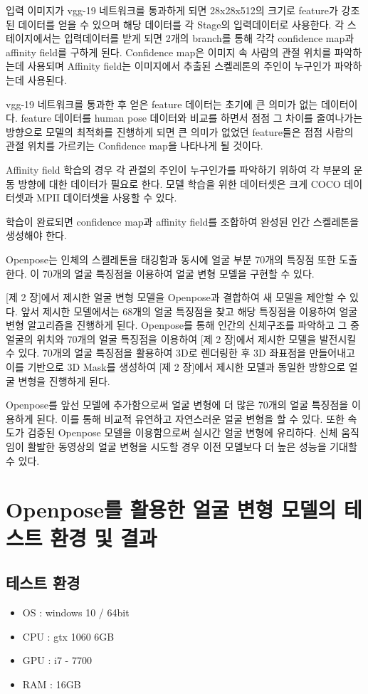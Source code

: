 \documentclass{oblivoir}
\newcommand{\spec}{
    \begin{itemize}
        \item OS : windows 10 / 64bit
        \item CPU : gtx 1060 6GB
        \item GPU : i7 - 7700
        \item RAM : 16GB
    \end{itemize}
    }
\begin{document}
입력 이미지가 vgg-19 네트워크를 통과하게 되면 28x28x512의 크기로 feature가 강조된 데이터를 얻을 수 있으며 해당 데이터를 각 Stage의 입력데이터로 사용한다. 각 스테이지에서는 입력데이터를 받게 되면 2개의 branch를 통해 각각 confidence map과 affinity field를 구하게 된다. Confidence map은 이미지 속 사람의 관절 위치를 파악하는데 사용되며 Affinity field는 이미지에서 추출된 스켈레톤의 주인이 누구인가 파악하는데 사용된다.

vgg-19 네트워크를 통과한 후 얻은 feature 데이터는 초기에 큰 의미가 없는 데이터이다. feature 데이터를 human pose 데이터와 비교를 하면서 점점 그 차이를 줄여나가는 방향으로 모델의 최적화를 진행하게 되면 큰 의미가 없었던 feature들은 점점 사람의 관절 위치를 가르키는 Confidence map을 나타나게 될 것이다.

Affinity field 학습의 경우 각 관절의 주인이 누구인가를 파악하기 위하여 각 부분의 운동 방향에 대한 데이터가 필요로 한다. 모델 학습을 위한 데이터셋은 크게 COCO 데이터셋과 MPII 데이터셋을 사용할 수 있다.

학습이 완료되면 confidence map과 affinity field를 조합하여 완성된 인간 스켈레톤을 생성해야 한다.

Openpose는 인체의 스켈레톤을 태깅함과 동시에 얼굴 부분 70개의 특징점 또한 도출 한다. 이 70개의 얼굴 특징점을 이용하여 얼굴 변형 모델을 구현할 수 있다.

[제 2 장]에서 제시한 얼굴 변형 모델을 Openpose과 결합하여 새 모델을 제안할 수 있다. 앞서 제시한 모델에서는 68개의 얼굴 특징점을 찾고 해당 특징점을 이용하여 얼굴 변형 알고리즘을 진행하게 된다. Openpose를 통해 인간의 신체구조를 파악하고 그 중 얼굴의 위치와 70개의 얼굴 특징점을 이용하여 [제 2 장]에서 제시한 모델을 발전시킬 수 있다. 70개의 얼굴 특징점을 활용하여 3D로 렌더링한 후 3D 좌표점을 만들어내고 이를 기반으로 3D Mask를 생성하여 [제 2 장]에서 제시한 모델과 동일한 방향으로 얼굴 변형을 진행하게 된다.

Openpose를 앞선 모델에 추가함으로써 얼굴 변형에 더 많은 70개의 얼굴 특징점을 이용하게 된다. 이를 통해 비교적 유연하고 자연스러운 얼굴 변형을 할 수 있다. 또한 속도가 검증된 Openpose 모델을 이용함으로써 실시간 얼굴 변형에 유리하다. 신체 움직임이 활발한 동영상의 얼굴 변형을 시도할 경우 이전 모델보다 더 높은 성능을 기대할 수 있다.

\section{Openpose를 활용한 얼굴 변형 모델의 테스트 환경 및 결과}

\subsection{테스트 환경}
\spec
\end{document}
